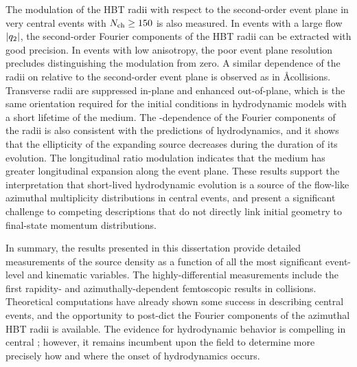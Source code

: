 The modulation of the HBT radii with respect to the second-order event plane in very central \pPb events with $\mbox{$N_{\mathrm{ch}}$} \geq 150$ is also measured.
In events with a large flow $|q_{2}|$, the second-order Fourier components of the HBT radii can be extracted with good precision.
In events with low anisotropy, the poor event plane resolution precludes distinguishing the modulation from zero.
A similar dependence of the radii on \tdpk relative to the second-order event plane is observed as in \AA collisions.
Transverse radii are suppressed in-plane and enhanced out-of-plane, which is the same orientation required for the initial conditions in hydrodynamic models with a short lifetime of the medium.
The \kt-dependence of the Fourier components of the radii is also consistent with the predictions of hydrodynamics, and it shows that the ellipticity of the expanding source decreases during the duration of its evolution.
The longitudinal ratio \Rlong modulation indicates that the medium has greater longitudinal expansion along the event plane.
These results support the interpretation that short-lived hydrodynamic evolution is a source of the flow-like azimuthal multiplicity distributions in central \pPb events, and present a significant challenge to competing descriptions that do not directly link initial geometry to final-state momentum distributions.

In summary, the results presented in this dissertation provide detailed measurements of the \pPb source density as a function of all the most significant event-level and kinematic variables.
The highly-differential measurements include the first rapidity- and azimuthally-dependent femtoscopic results in \pA collisions.
Theoretical computations have already shown some success in describing central \pPb events, and the opportunity to post-dict the Fourier components of the azimuthal HBT radii is available.
The evidence for hydrodynamic behavior is compelling in central \pPb; however, it remains incumbent upon the field to determine more precisely how and where the onset of hydrodynamics occurs.


